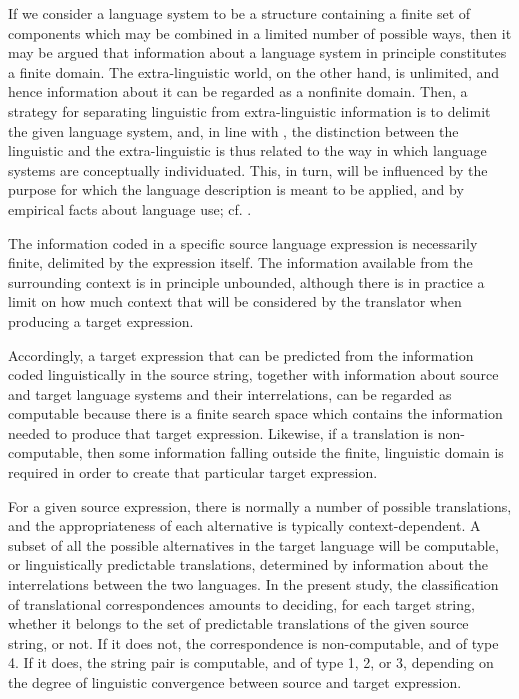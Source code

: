 \documentclass[output=paper]{LSP/langsci}
\begin{document}
If we consider a language system to be a structure containing a finite set of components which may be combined in a limited number of possible ways, then it may be argued that information about a language system in principle constitutes a finite domain. The extra-linguistic world, on the other hand, is unlimited, and hence information about it can be regarded as a nonfinite domain. Then, a strategy for separating linguistic from extra-linguistic information is to delimit the given language system, and, in line with  \citet[9]{Dyvik2003}, the distinction between the linguistic and the extra-linguistic is thus related to the way in which language systems are conceptually individuated. This, in turn, will be influenced by the purpose for which the language description is meant to be applied, and by empirical facts about language use; cf. \citet[93]{Thunes2011}. 

The information coded in a specific source language expression is necessarily finite, delimited by the expression itself. The information available from the surrounding context is in principle unbounded, although there is in practice a limit on how much context that will be considered by the translator when producing a target expression. 

Accordingly, a target expression that can be predicted from the information coded linguistically in the source string, together with information about source and target language systems and their interrelations, can be regarded as computable because there is a finite search space which contains the information needed to produce that target expression. Likewise, if a translation is non-com\-put\-able, then some information falling outside the finite, linguistic domain is required in order to create that particular target expression.

For a given source expression, there is normally a number of possible translations, and the appropriateness of each alternative is typically context-dependent. A subset of all the possible alternatives in the target language will be computable, or linguistically predictable translations, determined by information about the interrelations between the two languages. In the present study, the classification of translational correspondences amounts to deciding, for each target string, whether it belongs to the set of predictable translations of the given source string, or not. If it does not, the correspondence is non-computable, and of type 4. If it does, the string pair is computable, and of type 1, 2, or 3, depending on the degree of linguistic convergence between source and target expression. 
\end{document}
